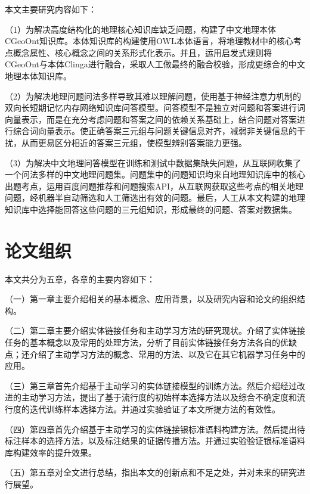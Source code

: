 本文主要研究内容如下：

（1）为解决高度结构化的地理核心知识库缺乏问题，构建了中文地理本体CGeoOnt知识库。本体知识库的构建使用OWL本体语言，将地理教材中的核心考点概念属性、核心概念之间的关系形式化表示。并且，运用启发式规则将CGeoOnt与本体Clinga进行融合，采取人工做最终的融合校验，形成更综合的中文地理本体知识库。

（2）为解决地理问题问法多样导致其难以理解问题，使用基于神经注意力机制的双向长短期记忆内存网络知识库问答模型。问答模型不是独立对问题和答案进行词向量表示，而是在充分考虑问题和答案之间的依赖关系基础上，结合问题对答案进行综合词向量表示。使正确答案三元组与问题关键信息对齐，减弱非关键信息的干扰，从而更易区分相近的答案三元组，使模型辨别答案能力更强。

（3）为解决中文地理问答模型在训练和测试中数据集缺失问题，从互联网收集了一个问法多样的中文地理问题集。问题集中的问题知识均来自地理知识库中的核心出题考点，运用百度问题推荐和问题搜索API，从互联网获取这些考点的相关地理问题，经机器半自动筛选和人工筛选出有效的问题。最后，人工从本文构建的地理知识库中选择能回答这些问题的三元组知识，形成最终的问题、答案对数据集。

\section{论文组织}
本文共分为五章，各章的主要内容如下：

（一）第一章主要介绍相关的基本概念、应用背景，以及研究内容和论文的组织结构。

（二）第二章主要介绍实体链接任务和主动学习方法的研究现状。介绍了实体链接任务的基本概念以及常用的处理方法，分析了目前实体链接任务方法各自的优缺点；还介绍了主动学习方法的概念、常用的方法、以及它在其它机器学习任务中的应用。

（三）第三章首先介绍基于主动学习的实体链接模型的训练方法。然后介绍经过改进的主动学习方法，提出了基于流行度的初始样本选择方法以及综合不确定度和流行度的迭代训练样本选择方法。并通过实验验证了本文所提方法的有效性。

（四）第四章首先介绍基于主动学习的实体链接银标准语料构建方法。然后提出待标注样本的选择方法，以及标注结果的证据传播方法。并通过实验验证银标准语料库构建效率的提升效果。

（五）第五章对全文进行总结，指出本文的创新点和不足之处，并对未来的研究进行展望。